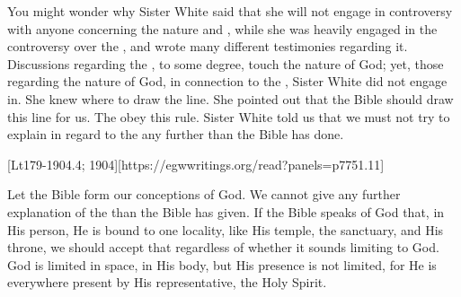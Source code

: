 You might wonder why Sister White said that she will not engage in controversy with anyone concerning the nature and , while she was heavily engaged in the controversy over the , and wrote many different testimonies regarding it. Discussions regarding the , to some degree, touch the nature of God; yet, those regarding the nature of God, in connection to the , Sister White did not engage in. She knew where to draw the line. She pointed out that the Bible should draw this line for us.  The  obey this rule. Sister White told us that we must not try to explain in regard to the  any further than the Bible has done.

[Lt179-1904.4; 1904][https://egwwritings.org/read?panels=p7751.11]

Let the Bible form our conceptions of God. We cannot give any further explanation of the  than the Bible has given. If the Bible speaks of God that, in His person, He is bound to one locality, like His temple, the sanctuary, and His throne, we should accept that regardless of whether it sounds limiting to God. God is limited in space, in His body, but His presence is not limited, for He is everywhere present by His representative, the Holy Spirit.

